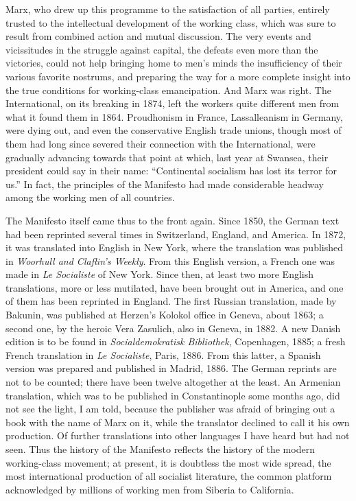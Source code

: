 Marx, who drew up this programme to the satisfaction of all parties, entirely trusted to the intellectual development of the working class, which was sure to result from combined action and mutual discussion. The very events and vicissitudes in the struggle against capital, the defeats even more than the victories, could not help bringing home to men's minds the insufficiency of their various favorite nostrums, and preparing the way for a more complete insight into the true conditions for working-class emancipation. And Marx was right. The International, on its breaking in 1874, left the workers quite different men from what it found them in 1864. Proudhonism in France, Lassalleanism in Germany, were dying out, and even the conservative English trade unions, though most of them had long since severed their connection with the International, were gradually advancing towards that point at which, last year at Swansea, their president could say in their name: ``Continental socialism has lost its terror for us.'' In fact, the principles of the Manifesto had made considerable headway among the working men of all countries. 

The Manifesto itself came thus to the front again. Since 1850, the German text had been reprinted several times in Switzerland, England, and America. In 1872, it was translated into English in New York, where the translation was published in \emph{Woorhull and Claflin's Weekly}. From this English version, a French one was made in \emph{Le Socialiste} of New York. Since then, at least two more English translations, more or less mutilated, have been brought out in America, and one of them has been reprinted in England. The first Russian translation, made by Bakunin, was published at Herzen's Kolokol office in Geneva, about 1863; a second one, by the heroic Vera Zasulich, also in Geneva, in 1882. A new Danish edition is to be found in \emph{Socialdemokratisk Bibliothek}, Copenhagen, 1885; a fresh French translation in \emph{Le Socialiste}, Paris, 1886. From this latter, a Spanish version was prepared and published in Madrid, 1886. The German reprints are not to be counted; there have been twelve altogether at the least. An Armenian translation, which was to be published in Constantinople some months ago, did not see the light, I am told, because the publisher was afraid of bringing out a book with the name of Marx on it, while the translator declined to call it his own production. Of further translations into other languages I have heard but had not seen. Thus the history of the Manifesto reflects the history of the modern working-class movement; at present, it is doubtless the most wide spread, the most international production of all socialist literature, the common platform acknowledged by millions of working men from Siberia to California. 

